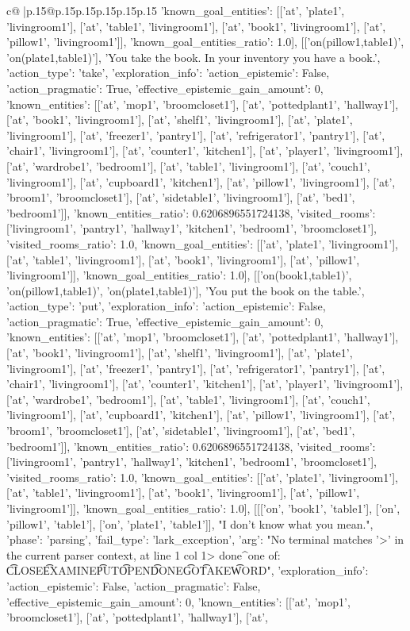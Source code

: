 \documentclass{article}
\begin{document}
{\begin{supertabular}{c@{$\;$}|p{.15\linewidth}@{}p{.15\linewidth}p{.15\linewidth}p{.15\linewidth}p{.15\linewidth}p{.15\linewidth}}
{{{'known_goal_entities': [['at', 'plate1', 'livingroom1'], ['at', 'table1', 'livingroom1'], ['at', 'book1', 'livingroom1'], ['at', 'pillow1', 'livingroom1']], 'known_goal_entities_ratio': 1.0}}], [['on(pillow1,table1)', 'on(plate1,table1)'], 'You take the book. In your inventory you have a book.', {'action_type': 'take', 'exploration_info': {'action_epistemic': False, 'action_pragmatic': True, 'effective_epistemic_gain_amount': 0, 'known_entities': [['at', 'mop1', 'broomcloset1'], ['at', 'pottedplant1', 'hallway1'], ['at', 'book1', 'livingroom1'], ['at', 'shelf1', 'livingroom1'], ['at', 'plate1', 'livingroom1'], ['at', 'freezer1', 'pantry1'], ['at', 'refrigerator1', 'pantry1'], ['at', 'chair1', 'livingroom1'], ['at', 'counter1', 'kitchen1'], ['at', 'player1', 'livingroom1'], ['at', 'wardrobe1', 'bedroom1'], ['at', 'table1', 'livingroom1'], ['at', 'couch1', 'livingroom1'], ['at', 'cupboard1', 'kitchen1'], ['at', 'pillow1', 'livingroom1'], ['at', 'broom1', 'broomcloset1'], ['at', 'sidetable1', 'livingroom1'], ['at', 'bed1', 'bedroom1']], 'known_entities_ratio': 0.6206896551724138, 'visited_rooms': ['livingroom1', 'pantry1', 'hallway1', 'kitchen1', 'bedroom1', 'broomcloset1'], 'visited_rooms_ratio': 1.0, 'known_goal_entities': [['at', 'plate1', 'livingroom1'], ['at', 'table1', 'livingroom1'], ['at', 'book1', 'livingroom1'], ['at', 'pillow1', 'livingroom1']], 'known_goal_entities_ratio': 1.0}}], [['on(book1,table1)', 'on(pillow1,table1)', 'on(plate1,table1)'], 'You put the book on the table.', {'action_type': 'put', 'exploration_info': {'action_epistemic': False, 'action_pragmatic': True, 'effective_epistemic_gain_amount': 0, 'known_entities': [['at', 'mop1', 'broomcloset1'], ['at', 'pottedplant1', 'hallway1'], ['at', 'book1', 'livingroom1'], ['at', 'shelf1', 'livingroom1'], ['at', 'plate1', 'livingroom1'], ['at', 'freezer1', 'pantry1'], ['at', 'refrigerator1', 'pantry1'], ['at', 'chair1', 'livingroom1'], ['at', 'counter1', 'kitchen1'], ['at', 'player1', 'livingroom1'], ['at', 'wardrobe1', 'bedroom1'], ['at', 'table1', 'livingroom1'], ['at', 'couch1', 'livingroom1'], ['at', 'cupboard1', 'kitchen1'], ['at', 'pillow1', 'livingroom1'], ['at', 'broom1', 'broomcloset1'], ['at', 'sidetable1', 'livingroom1'], ['at', 'bed1', 'bedroom1']], 'known_entities_ratio': 0.6206896551724138, 'visited_rooms': ['livingroom1', 'pantry1', 'hallway1', 'kitchen1', 'bedroom1', 'broomcloset1'], 'visited_rooms_ratio': 1.0, 'known_goal_entities': [['at', 'plate1', 'livingroom1'], ['at', 'table1', 'livingroom1'], ['at', 'book1', 'livingroom1'], ['at', 'pillow1', 'livingroom1']], 'known_goal_entities_ratio': 1.0}}], [[['on', 'book1', 'table1'], ['on', 'pillow1', 'table1'], ['on', 'plate1', 'table1']], "I don't know what you mean.", {'phase': 'parsing', 'fail_type': 'lark_exception', 'arg': "No terminal matches '>' in the current parser context, at line 1 col 1\n\n> done\n^\nExpected one of: \n\t* CLOSE\n\t* EXAMINE\n\t* PUT\n\t* OPEN\n\t* DONE\n\t* GO\n\t* TAKE\n\t* WORD\n", 'exploration_info': {'action_epistemic': False, 'action_pragmatic': False, 'effective_epistemic_gain_amount': 0, 'known_entities': [['at', 'mop1', 'broomcloset1'], ['at', 'pottedplant1', 'hallway1'], ['at', }}}
\end{supertabular}}
\end{document}
